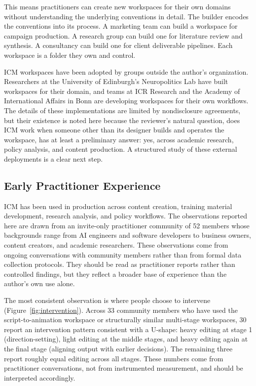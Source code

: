 \documentclass[acmlarge,nonacm,screen]{acmart}
\begin{document}
This means practitioners can create new workspaces for their own domains without understanding the underlying conventions in detail. The builder encodes the conventions into its process. A marketing team can build a workspace for campaign production. A research group can build one for literature review and synthesis. A consultancy can build one for client deliverable pipelines. Each workspace is a folder they own and control.

ICM workspaces have been adopted by groups outside the author's organization. Researchers at the University of Edinburgh's Neuropolitics Lab have built workspaces for their domain, and teams at ICR Research and the Academy of International Affairs in Bonn are developing workspaces for their own workflows. The details of these implementations are limited by nondisclosure agreements, but their existence is noted here because the reviewer's natural question, does ICM work when someone other than its designer builds and operates the workspace, has at least a preliminary answer: yes, across academic research, policy analysis, and content production. A structured study of these external deployments is a clear next step.

\subsection{Early Practitioner Experience}

ICM has been used in production across content creation, training material development, research analysis, and policy workflows. The observations reported here are drawn from an invite-only practitioner community of 52 members whose backgrounds range from AI engineers and software developers to business owners, content creators, and academic researchers. These observations come from ongoing conversations with community members rather than from formal data collection protocols. They should be read as practitioner reports rather than controlled findings, but they reflect a broader base of experience than the author's own use alone.

The most consistent observation is where people choose to intervene (Figure~\ref{fig:intervention}). Across 33 community members who have used the script-to-animation workspace or structurally similar multi-stage workspaces, 30 report an intervention pattern consistent with a U-shape: heavy editing at stage 1 (direction-setting), light editing at the middle stages, and heavy editing again at the final stage (aligning output with earlier decisions). The remaining three report roughly equal editing across all stages. These numbers come from practitioner conversations, not from instrumented measurement, and should be interpreted accordingly.
\end{document}
